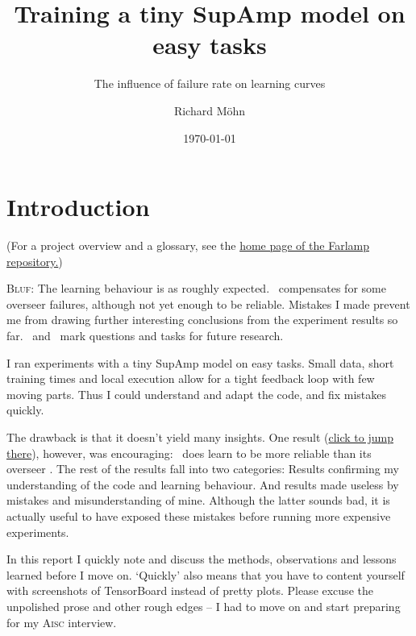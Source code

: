 \documentclass{farlamp}
\title{Training a tiny SupAmp model on easy tasks}
\subtitle{The influence of failure rate on learning curves}
\author{Richard Möhn}
\date{\today}
\begin{document}
\maketitle
\tableofcontents

\section{Introduction}

(For a project overview and a glossary, see the
\href{https://github.com/rmoehn/farlamp}{home page of the Farlamp repository.})

\textsc{Bluf}: The learning behaviour is as roughly expected. \Xpa\ compensates
for some overseer failures, although not yet enough to be reliable. Mistakes I
made prevent me from drawing further interesting conclusions from the experiment
results so far. \OQsymbol\ and \TODOsymbol\ mark questions and tasks for future
research.

I ran experiments with a tiny SupAmp model on easy tasks. Small data, short
training times and local execution allow for a tight feedback loop with few
moving parts. Thus I could understand and adapt the code, and fix mistakes
quickly.

The drawback is that it doesn't yield many insights. One result
(\hyperlink{interesting}{click to jump there}), however, was encouraging: \Xpa\
does learn to be more reliable than its overseer \AmpHp. The rest of the results
fall into two categories: Results confirming my understanding of the code and
learning behaviour. And results made useless by mistakes and misunderstanding of
mine. Although the latter sounds bad, it is actually useful to have exposed
these mistakes before running more expensive experiments.

In this report I quickly note and discuss the methods, observations and lessons
learned before I move on. ‘Quickly’ also means that you have to content yourself
with screenshots of TensorBoard instead of pretty plots. Please excuse the
unpolished prose and other rough edges – I had to move on and start preparing
for my \textsc{Aisc} interview.


\end{document}
